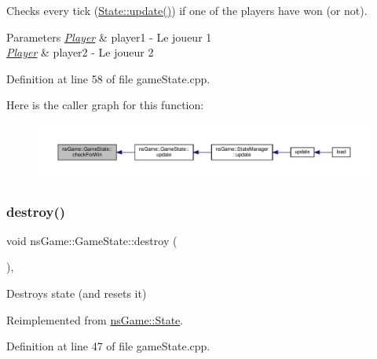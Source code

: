 Checks every tick (\hyperlink{structns_game_1_1_state_ae809e89ac9df4a43ab90d5d5932e2bc7}{State\+::update()}) if one of the players have won (or not). 


\begin{DoxyParams}{Parameters}
{\em \hyperlink{classns_game_1_1_player}{Player}} & player1 -\/ Le joueur 1 \\
\hline
{\em \hyperlink{classns_game_1_1_player}{Player}} & player2 -\/ Le joueur 2 \\
\hline
\end{DoxyParams}


Definition at line 58 of file game\+State.\+cpp.

Here is the caller graph for this function\+:\nopagebreak
\begin{figure}[H]
\begin{center}
\leavevmode
\includegraphics[width=350pt]{classns_game_1_1_game_state_a78176e52c8f3c745bb88a4214f5aa29b_icgraph}
\end{center}
\end{figure}
\mbox{\label{classns_game_1_1_game_state_ac0fdc8e463ca2e79a0fb58e12e5b39c9}} 
\subsubsection{\texorpdfstring{destroy()}{destroy()}}
{\footnotesize\ttfamily void ns\+Game\+::\+Game\+State\+::destroy (\begin{DoxyParamCaption}{ }\end{DoxyParamCaption})\hspace{0.3cm}{\ttfamily [override]}, {\ttfamily [virtual]}}



Destroys state (and resets it) 



Reimplemented from \hyperlink{structns_game_1_1_state_a70a0cf146071a8f9fcb8ca0b2c0f8f44}{ns\+Game\+::\+State}.



Definition at line 47 of file game\+State.\+cpp.

